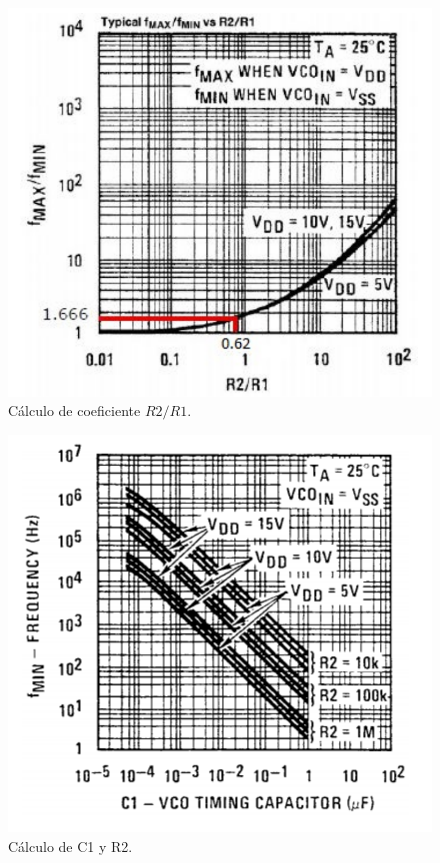 \documentclass[twocolumn]{article}
\begin{document}
\begin{figure}[!ht]
  \centering    
  \includegraphics[width=\columnwidth]{imagenes/fig3.jpg}
	\caption{Cálculo de coeficiente $R2/R1$.}\label{fig:fig3}
\end{figure}

\begin{figure}[!ht]
  \centering    
  \includegraphics[width=\columnwidth]{imagenes/fig4.jpg}
	\caption{Cálculo de C1 y R2.}\label{fig:fig4}
\end{figure}
\end{document}
